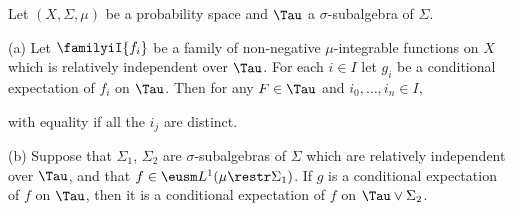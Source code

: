  Let $(X,\Sigma,\mu)$ be a probability space and
$\Tau$ a $\sigma$-subalgebra of $\Sigma$.

(a) Let $\familyiI{f_i}$ be a family of
non-negative $\mu$-integrable functions on $X$ which is relatively
independent over $\Tau$.   For each $i\in I$ let
$g_i$ be a conditional expectation of $f_i$ on $\Tau$.   Then for any
$F\in\Tau$ and $i_0,\ldots,i_n\in I$,


\noindent with equality if all the $i_j$ are distinct.

(b)
Suppose that $\Sigma_1$, $\Sigma_2$ are $\sigma$-subalgebras of
$\Sigma$ which are relatively independent over $\Tau$, and that
$f\in\eusm L^1(\mu\restr\Sigma_1)$.   If $g$ is a conditional expectation
of $f$ on $\Tau$, then it is a conditional expectation of $f$ on
$\Tau\vee\Sigma_2$.

